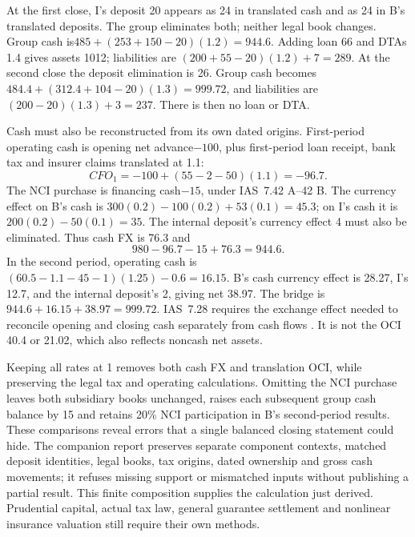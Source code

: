 At the first close, I's deposit 20 appears as 24 in translated cash and as 24
in B's translated deposits. The group eliminates both; neither legal book
changes. Group cash is\(485+(253+150-20)(1.2)=944.6\). Adding loan 66 and
DTAs 1.4 gives assets 1012; liabilities are
\((200+55-20)(1.2)+7=289\). At the second close the deposit elimination
is 26. Group cash becomes\(484.4+(312.4+104-20)(1.3)=999.72\), and liabilities
are\((200-20)(1.3)+3=237\). There is then no loan or DTA.

Cash must also be reconstructed from its own dated origins. First-period
operating cash is opening net advance\(-100\), plus first-period loan receipt,
bank tax and insurer claims translated at 1.1:
\begin{equation}
 CFO_1=-100+(55-2-50)(1.1)=-96.7.
\end{equation}
The NCI purchase is financing cash\(-15\), under IAS~7.42 A--42 B.
The currency effect on B's cash is
\(300(0.2)-100(0.2)+53(0.1)=45.3\); on I's cash it is
\(200(0.2)-50(0.1)=35\). The internal deposit's currency effect 4 must also
be eliminated. Thus cash FX is 76.3 and
\begin{equation}
 980-96.7-15+76.3=944.6.
\end{equation}
In the second period, operating cash is
\((60.5-1.1-45-1)(1.25)-0.6=16.15\). B's cash currency effect is 28.27,
I's 12.7, and the internal deposit's 2, giving net 38.97. The bridge is
\(944.6+16.15+38.97=999.72\). IAS~7.28 requires the exchange effect needed
to reconcile opening and closing cash separately from cash flows
\citep{eu20231803}. It is not the OCI 40.4 or 21.02, which also reflects
noncash net assets.

Keeping all rates at 1 removes both cash FX and translation OCI, while
preserving the legal tax and operating calculations. Omitting the NCI purchase
leaves both subsidiary books unchanged, raises each subsequent group cash
balance by 15 and retains 20\% NCI participation in B's second-period results.
These comparisons reveal errors that a single balanced closing statement could
hide. The companion  report preserves separate component
contexts, matched deposit identities, legal books, tax origins, dated ownership
and gross cash movements; it refuses missing support or mismatched inputs
without publishing a partial result. This finite composition supplies the
calculation just derived. Prudential capital, actual tax law, general guarantee
settlement and nonlinear insurance valuation still require their own methods.
